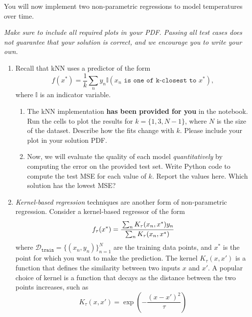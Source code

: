 \documentclass[submit]{../harvardml}
\begin{document}
\begin{problem}

You will now implement two non-parametric regressions to model temperatures over time.  

\vspace{0.5cm}
\noindent\emph{Make sure to include all required plots in your PDF. Passing all test cases does not guarantee that your solution is correct, and we encourage you to write your own. }

\begin{enumerate}
\item 
 Recall that kNN uses a predictor of the form
\[
  f(x^*) = \frac{1}{k} \sum_n y_n \mathbb{I}(x_n \texttt{ is one of k-closest to } x^*),
\]
where $\mathbb{I}$ is an indicator variable. 
\begin{enumerate}

  \item The kNN implementation \textbf{has been provided for you} in the notebook. Run the cells to plot the results for $k=\{1, 3, N-1\}$, where $N$ is the size of the dataset. Describe how the fits change with $k$. Please include your plot in your solution PDF.

  \item Now, we will evaluate the quality of each model \emph{quantitatively} by computing the error on the provided test set. Write Python code to compute the test MSE for each value of $k$.  Report the values here. Which solution has the lowest MSE? 
  
\end{enumerate}

\item \textit{Kernel-based regression} techniques are another form of non-parametric regression. Consider a kernel-based
regressor of the form 
\begin{equation*}
  f_\tau(x^*) = \cfrac{\sum_{n} K_\tau(x_n,x^*) y_n}{\sum_n K_\tau(x_n, x^*)}
\end{equation*}
where $\mathcal{D}_\texttt{train} = \{(x_n,y_n)\}_{n = 1} ^N$ are the
training data points, and $x^*$ is the point for which you want to
make the prediction.  The kernel $K_\tau(x,x')$ is a function that
defines the similarity between two inputs $x$ and $x'$. A popular
choice of kernel is a function that decays as the distance between the
two points increases, such as
\begin{equation*}
  K_\tau(x,x') = \exp\left(-\frac{(x-x')^2}{\tau}\right)
\end{equation*}


\end{enumerate}
\end{problem}
\end{document}
